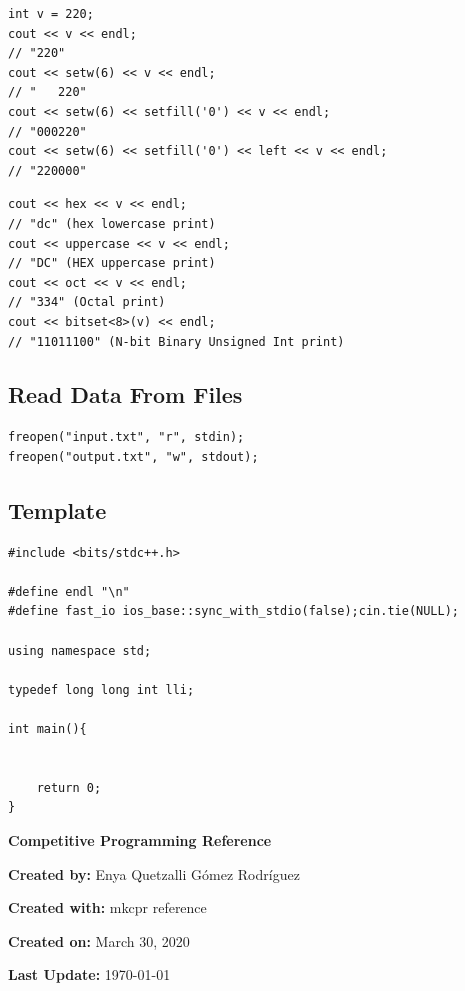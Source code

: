 \documentclass[twoside]{article}
\begin{document}
\begin{multicols*}{2}
\begin{verbatim}
\end{verbatim}
\vspace{-12pt}
\begin{verbatim}
int v = 220;
cout << v << endl;
// "220"
cout << setw(6) << v << endl;
// "   220"
cout << setw(6) << setfill('0') << v << endl;
// "000220"
cout << setw(6) << setfill('0') << left << v << endl;
// "220000"

\end{verbatim}
\vspace{-12pt}
\begin{verbatim}
cout << hex << v << endl;
// "dc" (hex lowercase print)
cout << uppercase << v << endl;
// "DC" (HEX uppercase print)
cout << oct << v << endl;
// "334" (Octal print)
cout << bitset<8>(v) << endl;
// "11011100" (N-bit Binary Unsigned Int print)

\end{verbatim}

\subsectionfont{\large\bfseries\sffamily\underline}
\subsection*{Read Data From Files}
\begin{verbatim}
freopen("input.txt", "r", stdin);
freopen("output.txt", "w", stdout);

\end{verbatim}

\subsectionfont{\large\bfseries\sffamily\underline}
\subsection*{Template}
\begin{verbatim}
#include <bits/stdc++.h>

#define endl "\n"
#define fast_io ios_base::sync_with_stdio(false);cin.tie(NULL);

using namespace std;

typedef long long int lli;

int main(){


	return 0;
}
\end{verbatim}

\end{multicols*}

    
    \newpage
    \thispagestyle{empty}
    \textcolor{coolgray}{\centerline{\Huge\textbf{Competitive Programming Reference}}}
    \vskip5mm
    \textcolor{coolgray}{\centerline{\large{\textbf{Created by:} Enya Quetzalli Gómez Rodríguez}}}
    \vskip1mm
    \textcolor{coolgray}{\centerline{\large{\textbf{Created with:} mkcpr reference}}}
    \vskip1mm
    \textcolor{coolgray}{\centerline{\large{\textbf{Created on:} March 30, 2020}}}
    \vskip1mm
    \textcolor{coolgray}{\centerline{\large{\textbf{Last Update:} \today}}}
    \vskip10mm
\end{document}
